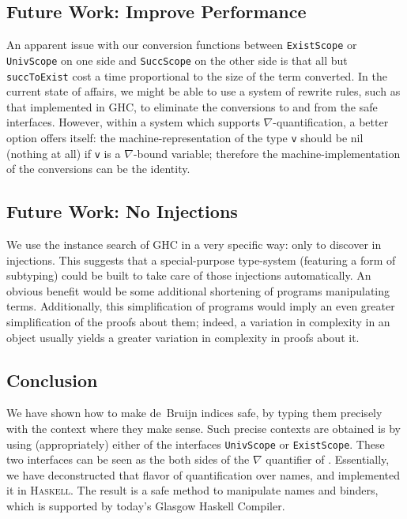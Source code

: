 \documentclass[9pt,preprint,authoryear]{sigplanconf}
\begin{document}
\subsection{Future Work{:} Improve Performance}

%
An apparent issue with our conversion functions between
    \textcolor[rgb]{0,0,0.80}{\texttt{ExistScope}} or \textcolor[rgb]{0,0,0.80}{\texttt{UnivScope}} on one side and \textcolor[rgb]{0,0,0.80}{\texttt{SuccScope}} on the
    other side is that all but \textcolor[rgb]{0,0,0.80}{\texttt{succToExist}} cost a time 
    proportional to the size of the term converted. In the current state of affairs, we 
    might be able to use a system of rewrite rules, such as that implemented in GHC, to 
    eliminate the conversions to and from the safe interfaces. However, within
    a system which supports \ensuremath{\nabla}-quantification, a better option offers itself{:}
    the machine-representation of the type \textcolor[rgb]{0,0,0.80}{\texttt{v}} should be
    nil (nothing at all) if \textcolor[rgb]{0,0,0.80}{\texttt{v}} is a \ensuremath{\nabla}-bound variable; 
    therefore the machine-implementation of the conversions
    can be the identity.%


\subsection{Future Work{:} No Injections}

%
    We use the instance search of GHC in a very specific way{:} only to discover in injections.
    This suggests that a special-purpose type-system (featuring a form of subtyping)
    could be built to take care of those injections automatically.
    An obvious benefit would be some additional shortening of programs manipulating terms.
    Additionally, this simplification of programs would imply an
    even greater simplification of the proofs about them; indeed, a variation in complexity in
    an object usually yields a greater variation in complexity in proofs about it.


\subsection{Conclusion}

%
  We have shown how to make de{~}Bruijn indices safe, by typing them precisely with 
  the context where they make sense. Such precise contexts are obtained is by using (appropriately)
  either of the interfaces \textcolor[rgb]{0,0,0.80}{\texttt{UnivScope}} or \textcolor[rgb]{0,0,0.80}{\texttt{ExistScope}}. These two interfaces can 
  be seen as the both sides of the \ensuremath{\nabla} quantifier of \citet{miller_proof_2003}. 
  Essentially, we have deconstructed that flavor of quantification over names, 
  and implemented it in \textsc{Haskell}. The result is a safe method to manipulate names
  and binders, which is supported by today{'}s Glasgow Haskell Compiler.%
\end{document}
